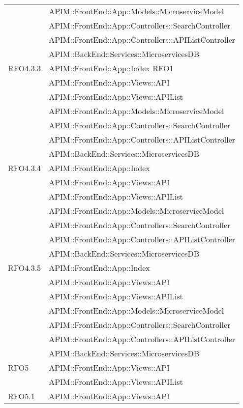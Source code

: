 \begin{longtable}{ p{4cm} | p{12cm} }
			& APIM::FrontEnd::App::Models::MicroserviceModel \\
			& APIM::FrontEnd::App::Controllers::SearchController \\
			& APIM::FrontEnd::App::Controllers::APIListController \\
			& APIM::BackEnd::Services::MicroservicesDB \\
			\hline
			RFO4.3.3
			& APIM::FrontEnd::App::Index RFO1 \\
			& APIM::FrontEnd::App::Views::API \\
			& APIM::FrontEnd::App::Views::APIList \\
			& APIM::FrontEnd::App::Models::MicroserviceModel \\
			& APIM::FrontEnd::App::Controllers::SearchController \\
			& APIM::FrontEnd::App::Controllers::APIListController \\
			& APIM::BackEnd::Services::MicroservicesDB \\
			\hline		
			RFO4.3.4
			& APIM::FrontEnd::App::Index \\
			& APIM::FrontEnd::App::Views::API \\
			& APIM::FrontEnd::App::Views::APIList \\
			& APIM::FrontEnd::App::Models::MicroserviceModel \\
			& APIM::FrontEnd::App::Controllers::SearchController \\
			& APIM::FrontEnd::App::Controllers::APIListController \\
			& APIM::BackEnd::Services::MicroservicesDB \\
			\hline		
			RFO4.3.5
			& APIM::FrontEnd::App::Index \\
			& APIM::FrontEnd::App::Views::API \\
			& APIM::FrontEnd::App::Views::APIList \\
			& APIM::FrontEnd::App::Models::MicroserviceModel \\
			& APIM::FrontEnd::App::Controllers::SearchController \\
			& APIM::FrontEnd::App::Controllers::APIListController \\
			& APIM::BackEnd::Services::MicroservicesDB \\
			\hline		
			RFO5
			& APIM::FrontEnd::App::Views::API \\
			& APIM::FrontEnd::App::Views::APIList \\
			\hline		
			RFO5.1
			& APIM::FrontEnd::App::Views::API \\

\end{longtable}
